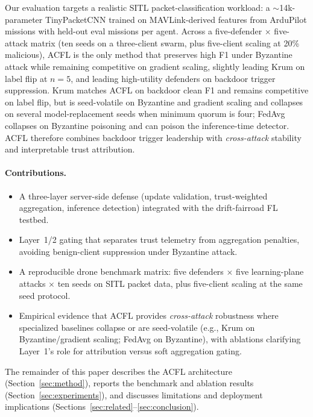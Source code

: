 \documentclass[journal]{IEEEtran}
\begin{document}
Our evaluation targets a realistic SITL packet-classification workload: a $\sim$14k-parameter TinyPacketCNN trained on MAVLink-derived features from ArduPilot missions with held-out eval missions per agent.
Across a five-defender $\times$ five-attack matrix (ten seeds on a three-client swarm, plus five-client scaling at 20\% malicious), ACFL is the only method that preserves high F1 under Byzantine attack while remaining competitive on gradient scaling, slightly leading Krum on label flip at $n{=}5$, and leading high-utility defenders on backdoor trigger suppression.
Krum matches ACFL on backdoor clean F1 and remains competitive on label flip, but is seed-volatile on Byzantine and gradient scaling and collapses on several model-replacement seeds when minimum quorum is four; FedAvg collapses on Byzantine poisoning and can poison the inference-time detector.
ACFL therefore combines backdoor trigger leadership with \emph{cross-attack} stability and interpretable trust attribution.

\paragraph{Contributions.}
\begin{itemize}
  \item A three-layer server-side defense (update validation, trust-weighted aggregation, inference detection) integrated with the drift-fairroad FL testbed.
  \item Layer~1/2 gating that separates trust telemetry from aggregation penalties, avoiding benign-client suppression under Byzantine attack.
  \item A reproducible drone benchmark matrix: five defenders $\times$ five learning-plane attacks $\times$ ten seeds on SITL packet data, plus five-client scaling at the same seed protocol.
  \item Empirical evidence that ACFL provides \emph{cross-attack} robustness where specialized baselines collapse or are seed-volatile (e.g., Krum on Byzantine/gradient scaling; FedAvg on Byzantine), with ablations clarifying Layer~1's role for attribution versus soft aggregation gating.
\end{itemize}

The remainder of this paper describes the ACFL architecture (Section~\ref{sec:method}), reports the benchmark and ablation results (Section~\ref{sec:experiments}), and discusses limitations and deployment implications (Sections~\ref{sec:related}--\ref{sec:conclusion}).
\end{document}
